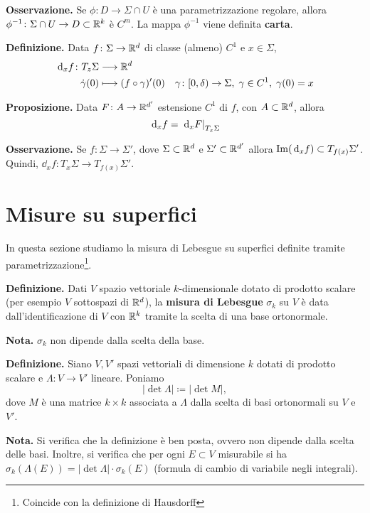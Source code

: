 \textbf{Osservazione.} Se $\phi \colon D \to \Sigma \cap U$ è una parametrizzazione regolare, allora $\phi^{-1} \colon \Sigma \cap U \to D \subset \mathbb R^k$ è $C^m$. La mappa $\phi^{-1}$ viene definita \textbf{carta}.

\textbf{Definizione.} Data $f \colon \Sigma \to \mathbb R^{d}$ di classe (almeno) $C^1$ e $x \in \Sigma$, 
%
\begin{align*}
	\,\mathrm{d}_x f \colon  T_z \Sigma & \longrightarrow \mathbb R^{d} \\
	\dot \gamma(0) & \longmapsto (f \circ \gamma)' (0) \quad \gamma \colon [0,\delta) \to \Sigma, \; \gamma \in C^1, \; \gamma(0) = x
\end{align*}


\textbf{Proposizione.} Data $F \colon A \to \mathbb R^{d'}$ estensione $C^1$ di $f$, con $A \subset \mathbb R^d$, allora
%
$$
	\,\mathrm{d}_x f = \left.\,\mathrm{d}_x F\right|_{T_x \Sigma}
$$
%

\textbf{Osservazione.} Se $f \colon \Sigma \to \Sigma'$, dove $\Sigma \subset \mathbb R^d$ e $\Sigma' \subset \mathbb R^{d'}$ allora $\operatorname{Im}(\,\mathrm{d}_x f) \subset T_{f(x)} \Sigma'$.
Quindi, $\dd_x f \colon T_x \Sigma \to T_{f(x)} \Sigma'$.


\section{Misure su superfici}

In questa sezione studiamo la misura di Lebesgue su superfici definite tramite parametrizzazione\footnote{Coincide con la definizione di Hausdorff}.

\textbf{Definizione.} Dati $V$ spazio vettoriale $k$-dimensionale dotato di prodotto scalare (per esempio $V$ sottospazi di $\mathbb R^d$), la \textbf{misura di Lebesgue} $\sigma_k$ su $V$ è data dall'identificazione di $V$ con $\mathbb R^k$ tramite la scelta di una base ortonormale.

\textbf{Nota.} $\sigma_k$ non dipende dalla scelta della base.


\textbf{Definizione.} Siano $V,V'$ spazi vettoriali di dimensione $k$ dotati di prodotto scalare e $\Lambda \colon V \to V'$ lineare. Poniamo
%
$$
	|\det \Lambda| \coloneqq |\det M|,
$$
%
dove $M$ è una matrice $k \times k$ associata a $\Lambda$ dalla scelta di basi ortonormali su $V$ e $V'$.

\textbf{Nota.} Si verifica che la definizione è ben posta, ovvero non dipende dalla scelta delle basi. Inoltre, si verifica che per ogni $E \subset V$ misurabile si ha $\sigma_k(\Lambda(E)) = |\det \Lambda| \cdot \sigma_k(E)$ (formula di cambio di variabile negli integrali).

